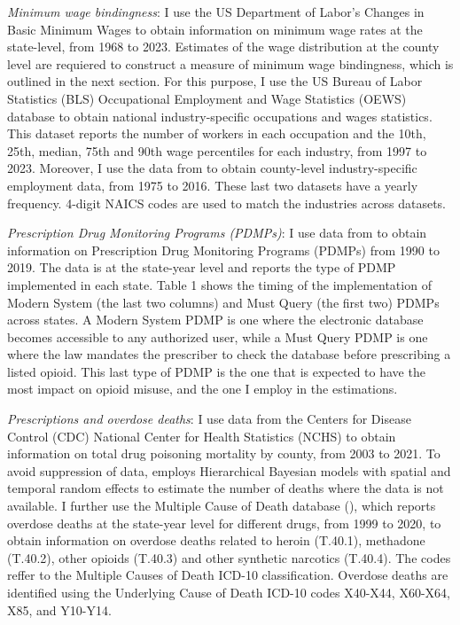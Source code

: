 \documentclass[12pt,a4paper]{article}
\begin{document}
\textit{Minimum wage bindingness}: I use the US Department of Labor's Changes in Basic Minimum Wages to obtain information on minimum wage rates at the state-level, from 1968 to 2023.
Estimates of the wage distribution at the county level are requiered to construct a measure of minimum wage bindingness, which is outlined in the next section.
For this purpose, I use the US Bureau of Labor Statistics (BLS) Occupational Employment and Wage Statistics (OEWS) database to obtain national industry-specific occupations and wages statistics.
This dataset reports the number of workers in each occupation and the 10th, 25th, median, 75th and 90th wage percentiles for each industry, from 1997 to 2023.
Moreover, I use the data from \textcite{Eckert2020} to obtain county-level industry-specific employment data, from 1975 to 2016.
These last two datasets have a yearly frequency. 4-digit NAICS codes are used to match the industries across datasets.

\textit{Prescription Drug Monitoring Programs (PDMPs)}: I use data from \textcite{Horwitz2021} to obtain information on Prescription Drug Monitoring Programs (PDMPs) from 1990 to 2019.
The data is at the state-year level and reports the type of PDMP implemented in each state.
Table 1 shows the timing of the implementation of Modern System (the last two columns) and Must Query (the first two) PDMPs across states.
A Modern System PDMP is one where the electronic database becomes accessible to any authorized user, while a Must Query PDMP is one where the law mandates the prescriber to check the database before prescribing a listed opioid.
This last type of PDMP is the one that is expected to have the most impact on opioid misuse, and the one I employ in the estimations.

\textit{Prescriptions and overdose deaths}: I use data from the Centers for Disease Control (CDC) National Center for Health Statistics (NCHS) to obtain information on total drug poisoning mortality by county, from 2003 to 2021.
To avoid suppression of data, \textcite{CLMort} employs Hierarchical Bayesian models with spatial and temporal random effects to estimate the number of deaths where the data is not available.
I further use the Multiple Cause of Death database (\cite{CDCMCD9920}), which reports overdose deaths at the state-year level for different drugs, from 1999 to 2020, to obtain information on overdose deaths related to heroin (T.40.1), methadone (T.40.2), other opioids (T.40.3) and other synthetic narcotics (T.40.4).
The codes reffer to the Multiple Causes of Death ICD-10 classification. 
Overdose deaths are identified using the Underlying Cause of Death ICD-10 codes X40-X44, X60-X64, X85, and Y10-Y14.
\end{document}

